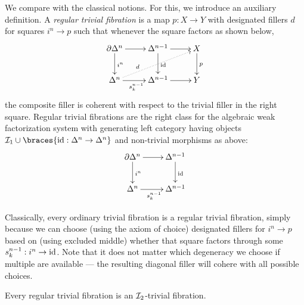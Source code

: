 \documentclass[reqno,10pt,a4paper,oneside]{amsart}
\begin{document}
We compare with the classical notions. For this, we introduce an auxiliary definition. A \emph{regular trivial fibration} is a map $p : X \to Y$ with designated fillers $d$ for squares $i^n \to p$ such that whenever the square factors as shown below,
\[
\xymatrix{
  \partial \Delta^n
  \ar[r]
  \ar[d]^{i^n}
&
  \Delta^{n-1}
  \ar[r]
  \ar[d]^{\id}
&
  X
  \ar[d]^{p}
\\
  \Delta^n
  \ar[r]_{s_k^{n-1}}
  \ar@{.>}[urr]^(0.3){d}
&
  \Delta^{n-1}
  \ar[r]
&
  Y
}
\]
the composite filler is coherent with respect to the trivial filler in the right square. Regular trivial fibrations are the right class for the algebraic weak factorization system with generating left category having objects $\cal{I}_1 \cup \braces{\id : \Delta^n \to \Delta^n}$ and non-trivial morphisms as above:
\[
\xymatrix{
  \partial \Delta^n
  \ar[r]
  \ar[d]^{i^n}
&
  \Delta^{n-1}
  \ar[d]^{\id}
\\
  \Delta^n
  \ar[r]_{s_k^{n-1}}
&
  \Delta^{n-1}
}
\]

Classically, every ordinary trivial fibration is a regular trivial fibration, simply because we can choose (using the axiom of choice) designated fillers for $i^n \to p$ based on (using excluded middle) whether that square factors through some $s_k^{n-1} : i^n \to \id$.
Note that it does not matter which degeneracy we choose if multiple are available --- the resulting diagonal filler will cohere with all possible choices.

\begin{lemma}
Every regular trivial fibration is an $\cal{I}_2$-trivial fibration.
\end{lemma}
\end{document}
